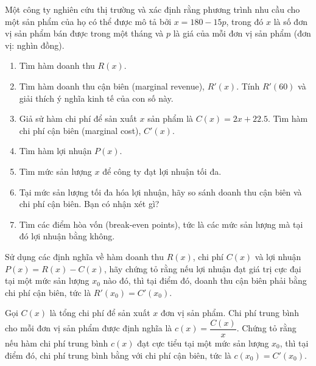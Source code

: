 \begin{exercise}
Một công ty nghiên cứu thị trường và xác định rằng phương trình nhu cầu cho một sản phẩm của họ có thể được mô tả bởi $x = 180 - 15p$, trong đó $x$ là số đơn vị sản phẩm bán được trong một tháng và $p$ là giá của mỗi đơn vị sản phẩm (đơn vị: nghìn đồng).
\begin{enumerate}[label=(\alph*)]
    \item Tìm hàm doanh thu $R(x)$.
    \item Tìm hàm doanh thu cận biên (marginal revenue), $R'(x)$. Tính $R'(60)$ và giải thích ý nghĩa kinh tế của con số này.
    \item Giả sử hàm chi phí để sản xuất $x$ sản phẩm là $C(x) = 2x + 22.5$. Tìm hàm chi phí cận biên (marginal cost), $C'(x)$.
    \item Tìm hàm lợi nhuận $P(x)$.
    \item Tìm mức sản lượng $x$ để công ty đạt lợi nhuận tối đa.
    \item Tại mức sản lượng tối đa hóa lợi nhuận, hãy so sánh doanh thu cận biên và chi phí cận biên. Bạn có nhận xét gì?
    \item Tìm các điểm hòa vốn (break-even points), tức là các mức sản lượng mà tại đó lợi nhuận bằng không.
\end{enumerate}
\end{exercise}
 
\begin{exercise}
Sử dụng các định nghĩa về hàm doanh thu $R(x)$, chi phí $C(x)$ và lợi nhuận $P(x) = R(x) - C(x)$, hãy chứng tỏ rằng nếu lợi nhuận đạt giá trị cực đại tại một mức sản lượng $x_0$ nào đó, thì tại điểm đó, doanh thu cận biên phải bằng chi phí cận biên, tức là $R'(x_0) = C'(x_0)$.
\end{exercise}
 
\begin{exercise}
Gọi $C(x)$ là tổng chi phí để sản xuất $x$ đơn vị sản phẩm. Chi phí trung bình cho mỗi đơn vị sản phẩm được định nghĩa là $c(x) = \dfrac{C(x)}{x}$. Chứng tỏ rằng nếu hàm chi phí trung bình $c(x)$ đạt cực tiểu tại một mức sản lượng $x_0$, thì tại điểm đó, chi phí trung bình bằng với chi phí cận biên, tức là $c(x_0) = C'(x_0)$.
\end{exercise}

